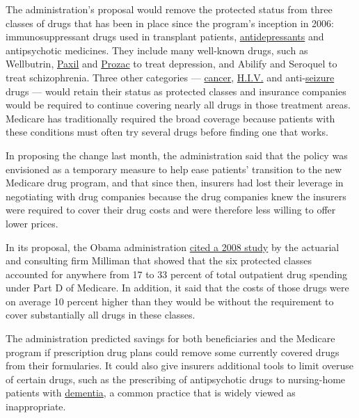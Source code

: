 The administration's proposal would remove the protected status from
three classes of drugs that has been in place since the program's
inception in 2006: immunosuppressant drugs used in transplant patients,
\href{http://topics.nytimes.com/top/news/health/diseasesconditionsandhealthtopics/antidepressants/index.html?inline=nyt-classifier}{antidepressants}
and antipsychotic medicines. They include many well-known drugs, such as
Wellbutrin,
\href{http://topics.nytimes.com/top/news/health/diseasesconditionsandhealthtopics/paxil_drug/index.html?inline=nyt-classifier}{Paxil}
and
\href{http://topics.nytimes.com/top/news/health/diseasesconditionsandhealthtopics/prozac_drug/index.html?inline=nyt-classifier}{Prozac}
to treat depression, and Abilify and Seroquel to treat schizophrenia.
Three other categories ---
\href{http://health.nytimes.com/health/guides/disease/cancer/overview.html?inline=nyt-classifier}{cancer},
\href{http://health.nytimes.com/health/guides/disease/aids/overview.html?inline=nyt-classifier}{H.I.V.}
and
anti-\href{http://health.nytimes.com/health/guides/symptoms/seizures/overview.html?inline=nyt-classifier}{seizure}
drugs --- would retain their status as protected classes and insurance
companies would be required to continue covering nearly all drugs in
those treatment areas. Medicare has traditionally required the broad
coverage because patients with these conditions must often try several
drugs before finding one that works.

In proposing the change last month, the administration said that the
policy was envisioned as a temporary measure to help ease patients'
transition to the new Medicare drug program, and that since then,
insurers had lost their leverage in negotiating with drug companies
because the drug companies knew the insurers were required to cover
their drug costs and were therefore less willing to offer lower prices.

In its proposal, the Obama administration
\href{http://amcp.org/WorkArea/DownloadAsset.aspx?id=9279}{cited a 2008
study} by the actuarial and consulting firm Milliman that showed that
the six protected classes accounted for anywhere from 17 to 33 percent
of total outpatient drug spending under Part D of Medicare. In addition,
it said that the costs of those drugs were on average 10 percent higher
than they would be without the requirement to cover substantially all
drugs in these classes.

The administration predicted savings for both beneficiaries and the
Medicare program if prescription drug plans could remove some currently
covered drugs from their formularies. It could also give insurers
additional tools to limit overuse of certain drugs, such as the
prescribing of antipsychotic drugs to nursing-home patients with
\href{http://health.nytimes.com/health/guides/disease/dementia/overview.html?inline=nyt-classifier}{dementia},
a common practice that is widely viewed as inappropriate.

